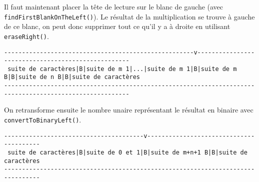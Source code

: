 \documentclass[a4paper,11pt]{article}
\begin{document}
Il faut maintenant placer la tête de lecture sur le blanc de gauche (avec \texttt{findFirstBlankOnTheLeft()}). Le résultat de la multiplication se trouve à gauche de ce blanc, on peut donc supprimer tout ce qu'il y a à droite en utilisant \texttt{eraseRight()}.
\begin{scriptsize}
\begin{verbatim}
-----------------------------------------------------v---------------------------------------------------
 suite de caractères|B|suite de m 1|...|suite de m 1|B|suite de m B|B|suite de n B|B|suite de caractères
---------------------------------------------------------------------------------------------------------
\end{verbatim}
\end{scriptsize}
On retransforme ensuite le nombre unaire représentant le résultat en binaire avec \texttt{convertTo\-Binary\-Left()}.
\begin{verbatim}
---------------------------------------v----------------------------------------
 suite de caractères|B|suite de 0 et 1|B|suite de m+n+1 B|B|suite de caractères
--------------------------------------------------------------------------------
\end{verbatim}
\end{document}

